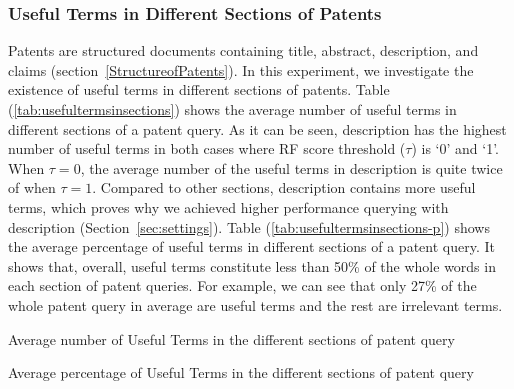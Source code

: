 \subsubsection{Useful Terms in Different Sections of Patents}
Patents are structured documents containing title, abstract, description, and claims (section~\ref{StructureofPatents}). In this experiment, we investigate the existence of useful terms in different sections of patents. 
Table (\ref{tab:usefultermsinsections}) shows the average number of useful terms in different sections of a patent query.  
As it can be seen, description has the highest number of useful terms in both cases where RF score threshold ($ \tau $) is `0' and `1'. When $ \tau = 0 $, the average number of the useful terms in description is quite twice of when $ \tau = 1 $. Compared to other sections, description contains more useful terms, which proves why we achieved higher performance querying with description (Section~\ref{sec:settings}).
Table (\ref{tab:usefultermsinsections-p}) shows the average percentage of useful terms in different sections of a patent query. It shows that, overall, useful terms constitute less than 50\% of the whole words in each section of patent queries. For example, we can see that only 27\% of the whole patent query in average are useful terms and the rest are irrelevant terms. 

\begin{table}[t!]
  \begin{center}
   \caption{Average number of Useful Terms in the different sections of patent query}
     
  \label{tab:usefultermsinsections}
  \end{center}  
\end{table}
\begin{table}[t!]
  \begin{center}
   \caption{Average percentage of Useful Terms in the different sections of patent query}
     
  \label{tab:usefultermsinsections-p}
  \end{center}  
\end{table}

